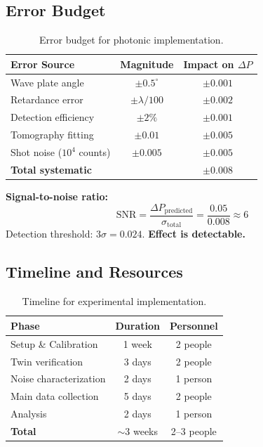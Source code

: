 \documentclass[11pt, onecolumn, letterpaper]{article}
\begin{document}
\subsection{Error Budget}
\begin{table}[h!]
\centering
\begin{tabular}{l c c}
\toprule
\textbf{Error Source} & \textbf{Magnitude} & \textbf{Impact on $\Delta P$} \\
\midrule
Wave plate angle & $\pm 0.5^\circ$ & $\pm 0.001$ \\
Retardance error & $\pm \lambda/100$ & $\pm 0.002$ \\
Detection efficiency & $\pm 2\%$ & $\pm 0.001$ \\
Tomography fitting & $\pm 0.01$ & $\pm 0.005$ \\
Shot noise ($10^4$ counts) & $\pm 0.005$ & $\pm 0.005$ \\
\midrule
\textbf{Total systematic} & & $\pm 0.008$ \\
\bottomrule
\end{tabular}
\caption{Error budget for photonic implementation.}
\label{tab:error_budget}
\end{table}

\textbf{Signal-to-noise ratio:}
\begin{equation}
\text{SNR} = \frac{\Delta P_{\text{predicted}}}{\sigma_{\text{total}}} = \frac{0.05}{0.008} \approx 6
\end{equation}
Detection threshold: $3\sigma = 0.024$. \textbf{Effect is detectable.}

\subsection{Timeline and Resources}
\begin{table}[h!]
\centering
\begin{tabular}{l c c}
\toprule
\textbf{Phase} & \textbf{Duration} & \textbf{Personnel} \\
\midrule
Setup \& Calibration & 1 week & 2 people \\
Twin verification & 3 days & 2 people \\
Noise characterization & 2 days & 1 person \\
Main data collection & 5 days & 2 people \\
Analysis & 2 days & 1 person \\
\midrule
\textbf{Total} & $\sim$3 weeks & 2--3 people \\
\bottomrule
\end{tabular}
\caption{Timeline for experimental implementation.}
\label{tab:timeline}
\end{table}
\end{document}
